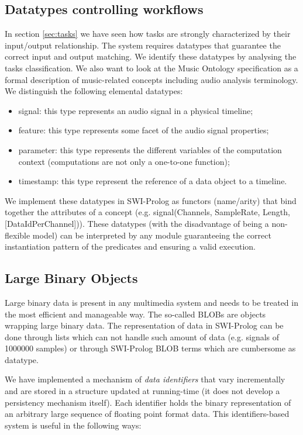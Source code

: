 \documentclass[runningheads]{llncs}
\begin{document}
\subsection{Datatypes controlling workflows}\label{subsec:datatypes}

In section \ref{sec:tasks} we have seen how tasks are strongly characterized by their input/output relationship. The system requires datatypes that guarantee the correct input and output matching. We identify these datatypes by analysing the tasks classification. We also want to look at the Music Ontology specification \cite{mo} as a formal description of music-related concepts including audio analysis terminology. We distinguish the following elemental datatypes:

\begin{itemize}
 \item signal: this type represents an audio signal in a physical timeline;
 \item feature: this type represents some facet of the audio signal properties;
 \item parameter: this type represents the different variables of the computation context (computations are not only a one-to-one function);
 \item timestamp: this type represent the reference of a data object to a timeline.
\end{itemize}

We implement these datatypes in SWI-Prolog as functors (name/arity) that bind together the attributes of a concept (e.g. signal(Channels, SampleRate, Length, [DataIdPerChannel])). These datatypes (with the disadvantage of being a non-flexible model) can be interpreted by any module guaranteeing the correct instantiation pattern of the predicates and ensuring a valid execution.

\subsection{Large Binary Objects}\label{subsec:blobs}

Large binary data is present in any multimedia system and needs to be treated in the most efficient and manageable way. The so-called BLOBs are objects wrapping large binary data. The representation of data in SWI-Prolog can be done through lists which can not handle such amount of data (e.g. signals of 1000000 samples) or through SWI-Prolog BLOB terms which are cumbersome as datatype.

We have implemented a mechanism of \textit{data identifiers} that vary incrementally and are stored in a structure updated at running-time (it does not develop a persistency mechanism itself). Each identifier holds the binary representation of an arbitrary large sequence of floating point format data. This identifiers-based system is useful in the following ways:
\end{document}
